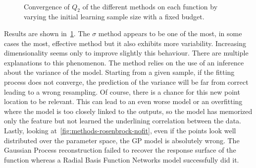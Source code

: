\begin{figure}[!ht]
~
\caption{Convergence of $Q_2$ of the different methods on each function by varying the initial learning sample size with a fixed budget.}
\label{fig:methods-cv}
\end{figure}

Results are shown in~\cref{fig:methods-cv}. The $\sigma$ method appears to be one of the most, in some cases the most, effective method but it also exhibits more variability. Increasing dimensionality seems only to improve slightly this behaviour. There are multiple explanations to this phenomenon. The method relies on the use of an inference about the variance of the model. Starting from a given sample, if the fitting process does not converge, the prediction of the variance will be far from correct leading to a wrong resampling. Of course, there is a chance for this new point location to be relevant. This can lead to an even worse model or an overfitting where the model is too closely linked to the outputs, so the model has memorized only the feature but not learned the underlining correlation between the data. Lastly, looking at~\cref{fig:methods-rosenbrock-nofit}, even if the points look well distributed over the parameter space, the GP model is absolutely wrong. The Gaussian Process reconstruction failed to recover the response surface of the function whereas a Radial Basis Function Networks model successfully did it.

